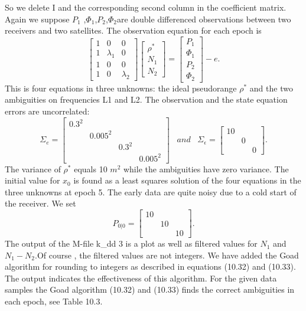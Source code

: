 So we delete I and the corresponding second column in the coefficient matrix. Again we suppose $P_{1}$ ,$\Phi_{1}$,$P_{2}$,$\Phi_{2}$are double differenced observations between two receivers and two satellites. The observation equation for each epoch is
$$
\begin{bmatrix}
1&0&0\\
1&\lambda_{1}&0\\
1&0&0\\
1&0&\lambda_{2}
\end{bmatrix}
\begin{bmatrix}
\rho^{*}\\N_{1}\\N_{2}
\end{bmatrix}
=
\begin{bmatrix}
P_{1}\\\Phi_{1}\\P_{2}\\\Phi_{2}
\end{bmatrix}
-e.
$$
This is four equations in three unknowns: the ideal pseudorange $\rho^{*}$ and the two ambiguities on frequencies L1 and L2. The observation and the state equation errors are uncorrelated:
\begin{equation}
\Sigma_{e}=
\begin{bmatrix}
0.3^{2}&&&\\
&0.005^{2}&&\\
&&0.3^{2}&\\
&&&0.005^{2}
\end{bmatrix}
\,\,\,\,\,and\,\,\,\,\,
\Sigma_{\epsilon}=
\begin{bmatrix}
10&&\\
&0&\\
&&0
\end{bmatrix}.
\end{equation}
The variance of $\rho^{*}$ equals 10 $m^{2}$ while the ambiguities have zero variance. The initial value for $x_{0}$ is found as a least squares solution of the four equations in the three unknowns at epoch 5. The early data are quite noisy due to a cold start of the receiver. We set
$$
P_{0|0}=
\begin{bmatrix}
10&&\\
&10&\\
&&10
\end{bmatrix}.
$$
The output of the M-file k\_dd 3 is a plot as well as filtered values for $N_{1}$ and $N_{1}-N_{2}$.Of course , the filtered values are not integers. We have added the Goad algorithm for rounding to integers as described in equations (10.32) and (10.33). The output indicates the effectiveness of this algorithm. For the given data samples the Goad algorithm (10.32) and (10.33) finds the correct ambiguities in each epoch, see Table 10.3.

